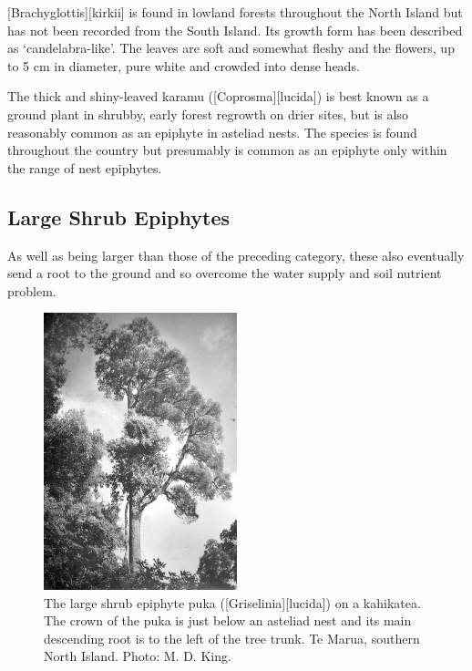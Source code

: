 [Brachyglottis][kirkii] is found in lowland forests throughout the North Island but has not been recorded from the South Island.
Its growth form has been described as `candelabra-like'.
The leaves are soft and somewhat fleshy and the flowers, up to 5 cm in diameter, pure white and crowded into dense heads.

The thick and shiny-leaved karamu ([Coprosma][lucida]) is best known as a ground plant in shrubby, early forest regrowth on drier sites, but is also reasonably common as an epiphyte in asteliad nests.
The species is found throughout the country but presumably is common as an epiphyte only within the range of nest epiphytes.

\subsection{Large Shrub Epiphytes}

As well as being larger than those of the preceding category, these also eventually send a root to the ground and so overcome the water supply and soil nutrient problem.

\begin{figure}
	\includegraphics[width=0.5\textwidth]{graphics/figure45puka.jpg}
	\centering
	\caption[The large shrub epiphyte puka]{The large shrub epiphyte puka ([Griselinia][lucida]) on a kahikatea.
	The crown of the puka is just below an asteliad nest and its main descending root is to the left of the tree trunk.
	Te Marua, southern North Island.
	Photo: M. D. King.}%
	\label{fig:45puka}
\end{figure}

